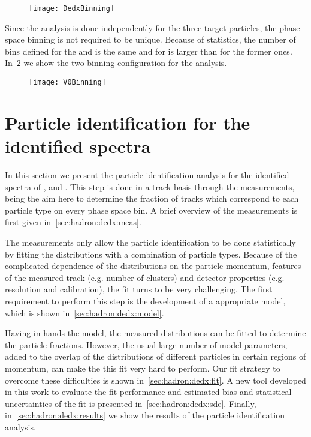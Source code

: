 \begin{figure}[!ht]
  \centering
  \texttt{[image: DedxBinning]}
  \caption{}
  \label{fig:hadron:binning:dedx}
\end{figure}

Since the \vzero analysis is done independently for the three target particles,
the phase space binning is not required to be unique. Because of statistics,
the number of bins defined for the \lamb and \antilamb is the same and
for \kzeros is larger than for the former ones.
In~\cref{fig:hadron:binning:vzero} we show the two
binning configuration for the \vzero analysis.

\begin{figure}[!ht]
  \centering
  \texttt{[image: V0Binning]}
  \caption{}
  \label{fig:hadron:binning:vzero}
\end{figure}


\section{Particle identification for the identified spectra}


In this section we present the particle identification
analysis for the identified spectra of \pions, \kaons and \protons.
This step is done in a track basis through the \dedx measurements,
being the aim here to determine the fraction of tracks which
correspond to each particle type on every phase space bin.
A brief overview of the \dedx measurements is first given
in~\cref{sec:hadron:dedx:meas}.

The \dedx measurements only allow the particle identification
to be done statistically by fitting
the \dedx distributions with a combination of particle
types. Because of the complicated dependence of the \dedx
distributions on the particle momentum,
features of the measured track (e.g. number of clusters) and
detector properties (e.g. resolution and calibration),
the \dedx fit turns to be very challenging. The first
requirement to perform this step is the development
of a appropriate \dedx model,
which is shown in~\cref{sec:hadron:dedx:model}.

Having in hands the \dedx model, the measured \dedx
distributions can be fitted to determine the particle
fractions. However, the usual large number of
model parameters, added to the
overlap of the \dedx distributions
of different particles in certain regions of momentum,
can make the this fit very hard to perform.
Our fit strategy to overcome these difficulties is shown
in~\cref{sec:hadron:dedx:fit}. A new tool
developed in this work to evaluate the fit performance
and estimated bias and statistical uncertainties of the fit
is presented in~\cref{sec:hadron:dedx:sde}. 
Finally, in~\cref{sec:hadron:dedx:results} we show the results
of the particle identification analysis.


